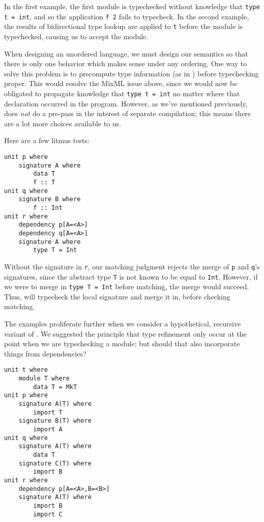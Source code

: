 In the first example, the first module is typechecked without knowledge
that \verb|type t = int|, and so the application \verb|f 2| fails to
typecheck.  In the second example, the results of bidirectional type
lookup are applied to \verb|t| before the module is typechecked,
causing us to accept the module.

When designing an unordered language, we must design our semantics so
that there is only one behavior which makes sense under any ordering.
One way to solve this problem is to precompute type information
(as in \OldBackpack{}) before typechecking proper.  This would resolve
the MixML issue above, since we would now be obligated to propagate
knowledge that \verb|type t = int| no matter where that declaration
occurred in the program.  However, as we've mentioned previously,
\Backpack{} does \emph{not} do a pre-pass in the interest of
separate compilation; this means there are a lot more choices available
to us.

Here are a few litmus tests:

\begin{lstlisting}
unit p where
    signature A where
        data T
        f :: T
unit q where
    signature B where
        f :: Int
unit r where
    dependency p[A=<A>]
    dependency q[A=<A>]
    signature A where
        type T = Int
\end{lstlisting}

Without the signature in \verb|r|, our matching judgment rejects the
merge of \verb|p| and \verb|q|'s signatures, since the abstract
type \verb|T| is not known to be equal to \verb|Int|.  However, if
we were to merge in \verb|type T = Int| before matching, the merge
would succeed.  Thus, \Backpack{} will typecheck the local signature
and merge it in, before checking matching.

The examples proliferate further when we consider a hypothetical,
recursive variant of \Backpack{}.  We suggested the principle that
type refinement only occur at the point when we are typechecking a
module; but should that also incorporate things from dependencies?

\begin{lstlisting}
unit t where
    module T where
        data T = MkT
unit p where
    signature A(T) where
        import T
    signature B(T) where
        import A
unit q where
    signature A(T) where
        data T
    signature C(T) where
        import B
unit r where
    dependency p[A=<A>,B=<B>]
    signature A(T) where
        import B
        import C
\end{lstlisting}

